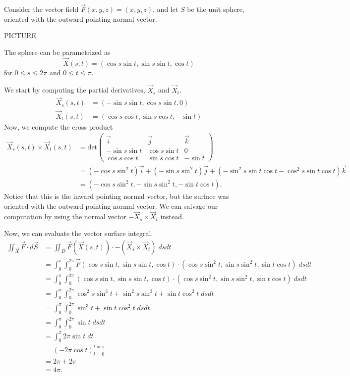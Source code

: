 \documentclass{ximera}
\begin{document}
\begin{example}
Consider the vector field $\vec{F}(x,y,z) = (x,y,z)$, and let $S$ be the unit sphere, oriented with the outward pointing normal vector.

PICTURE

The sphere can be parametrized as
\[
\vec{X}(s,t) = (\cos s \sin t, \sin s \sin t, \cos t)
\]
for $0\leq s\leq 2\pi$ and $0\leq t\leq \pi$.

We start by computing the partial derivatives, $\vec{X}_s$ and $\vec{X}_t$.
\begin{align*}
\vec{X}_s(s,t) &= (-\sin s \sin t, \cos s \sin t, 0)\\
\vec{X}_t(s,t) &= (\cos s\cos t, \sin s\cos t, -\sin t)
\end{align*}
Now, we compute the cross product
\begin{align*}
\vec{X}_s(s,t)\times \vec{X}_t(s,t) &= \text{det}\begin{pmatrix}
\vec{i} & \vec{j} & \vec{k}\\
-\sin s \sin t & \cos s \sin t & 0\\
\cos s\cos t & \sin s\cos t & -\sin t
\end{pmatrix}\\
&= (-\cos s\sin^2 t)\vec{i} + (-\sin s\sin^2 t)\vec{j} + (-\sin^2 s\sin t\cos t - \cos^2 s\sin t\cos t)\vec{k}\\
&=  (-\cos s\sin^2 t,-\sin s\sin^2 t,-\sin t\cos t).
\end{align*}
Notice that this is the inward pointing normal vector, but the surface was oriented with the outward pointing normal vector. We can salvage our computation by using the normal vector $-\vec{X}_s\times \vec{X}_t$ instead. 

Now, we can evaluate the vector surface integral.
\begin{align*}
\iint_{\vec{X}}\vec{F}\cdot d\vec{S} &= \iint_D \vec{F}(\vec{X}(s,t))\cdot -(\vec{X}_s\times\vec{X}_t)\;dsdt\\
&= \int_0^\pi\int_0^{2\pi} \vec{F}(\cos s \sin t, \sin s \sin t, \cos t)\cdot (\cos s\sin^2 t,\sin s\sin^2 t,\sin t\cos t)\;dsdt\\
&= \int_0^\pi\int_0^{2\pi} (\cos s \sin t, \sin s \sin t, \cos t)\cdot (\cos s\sin^2 t,\sin s\sin^2 t,\sin t\cos t)\;dsdt\\
&= \int_0^\pi\int_0^{2\pi} \cos^2 s\sin^3 t + \sin^2 s\sin^3 t + \sin t\cos^2 t\;dsdt\\
&= \int_0^\pi\int_0^{2\pi} \sin^3 t + \sin t\cos^2 t\;dsdt\\
&= \int_0^\pi\int_0^{2\pi} \sin t\;dsdt\\
&= \int_0^\pi 2\pi\sin t\;dt\\
&= (-2\pi\cos t)_{t=0}^{t = \pi}\\
&= 2\pi +2\pi\\
&= 4\pi.
\end{align*}
\end{example}
\end{document}
